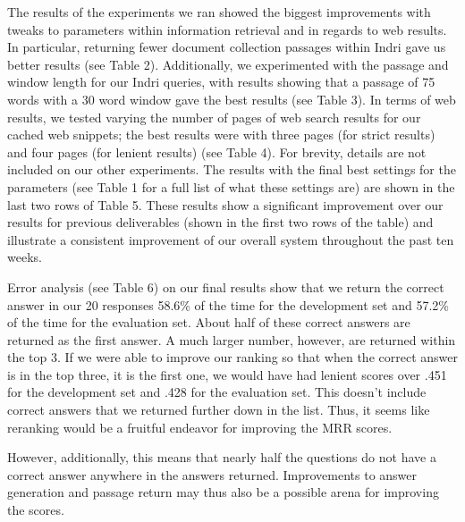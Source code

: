 \documentclass[11pt]{article}
\begin{document}
The results of the experiments we ran showed the biggest improvements with tweaks to parameters within information retrieval and in regards to web results.  In particular, returning fewer document collection passages within Indri gave us better results (see Table 2).  Additionally, we experimented with the passage and window length for our Indri queries, with results showing that a passage of 75 words with a 30 word window gave the best results (see Table 3).  In terms of web results, we tested varying the number of pages of web search results for our cached web snippets; the best results were with three pages (for strict results) and four pages (for lenient results) (see Table 4).  For brevity, details are not included on our other experiments.  The results with the final best settings for the parameters (see Table 1 for a full list of what these settings are) are shown in the last two rows of Table 5.  These results show a significant improvement over our results for previous deliverables (shown in the first two rows of the table) and illustrate a consistent improvement of our overall system throughout the past ten weeks.

Error analysis (see Table 6) on our final results show that we return the correct answer in our 20 responses 58.6\% of the time for the development set and 57.2\% of the time for the evaluation set.  About half of these correct answers are returned as the first answer.  A much larger number, however, are returned within the top 3.  If we were able to improve our ranking so that when the correct answer is in the top three, it is the first one, we would have had lenient scores over .451 for the development set and .428 for the evaluation set.  This doesn't include correct answers that we returned further down in the list.  Thus, it seems like reranking would be a fruitful endeavor for improving the MRR scores.

However, additionally, this means that nearly half the questions do not have a correct answer anywhere in the answers returned.  Improvements to answer generation and passage return may thus also be a possible arena for improving the scores.
\end{document}
